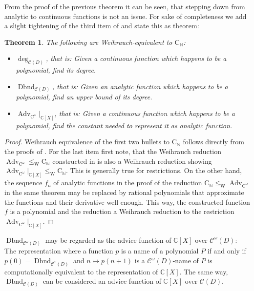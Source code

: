 \documentclass{eptcs-modified}
\newtheorem{theorem}{Theorem}
\newcommand{\leqW}{\leq_{\textrm{W}}}
\newcommand{\CCN}{\mathrm{C}_{\NN}}
\newcommand{\C}{\textrm{C}}
\newcommand{\NN}{\mathbb{N}}
\newcommand{\CC}{\mathbb{C}}
\newcommand{\analytic}{\mathcal C^\omega(D)}
\newcommand{\cont}{\mathcal C(D)}
\newcommand{\Advc}{\operatorname{Adv}_{\C^\omega}}
\newcommand{\dbnd}{\operatorname{Dbnd}}
\begin{document}
			From the proof of the previous theorem it can be seen, that stepping down from analytic to continuous functions is not an issue.
			For sake of completeness we add a slight tightening of the third item of  and state this as theorem:

			\begin{theorem}\label{resu:polynomials as continuous functions}
				The following are Weihrauch-equivalent to $\CCN$:
				\begin{itemize}
					\item $\deg_{\cont}$, that is: Given a continuous function which happens to be a polynomial, find its degree.
					\item $\dbnd_{\cont}$, that is: Given an analytic function which happens to be a polynomial, find an upper bound of its degree.
					\item $\Advc|_{\CC[X]}$, that is: Given a continuous function which happens to be a polynomial, find the constant needed to represent it as analytic function.
				\end{itemize}
			\end{theorem}
			\begin{proof}
				Weihrauch equivalence of the first two bullets to $\CCN$ follows directly from the proofs of .
				For the last item first note, that the Weihrauch reduction $\Advc\leqW\CCN$ constructed in  is also a Weihrauch reduction showing $\Advc|_{\CC[X]}\leqW\CCN$.
				This is generally true for restrictions.
				On the other hand, the sequence $f_n$ of analytic functions in the proof of the reduction $\CCN\leqW\Advc$ in the same theorem may be replaced by rational polynomials that approximate the functions and their derivative well enough.
				This way, the constructed function $f$ is a polynomial and the reduction a Weihrauch reduction to the restriction $\Advc|_{\CC[X]}$.
			\end{proof}

			$\dbnd_{\analytic}$ may be regarded as the advice function of $\CC[X]$ over $\analytic$: The representation where a function $p$ is a name of a polynomial $P$ if and only if $p(0) = \dbnd_{\analytic}$ and $n\mapsto p(n+1)$ is a $\analytic$-name of $P$ is computationally equivalent to the representation of $\CC[X]$.
			The same way, $\dbnd_{\cont}$ can be considered an advice function of $\CC[X]$ over $\cont$.
\end{document}
